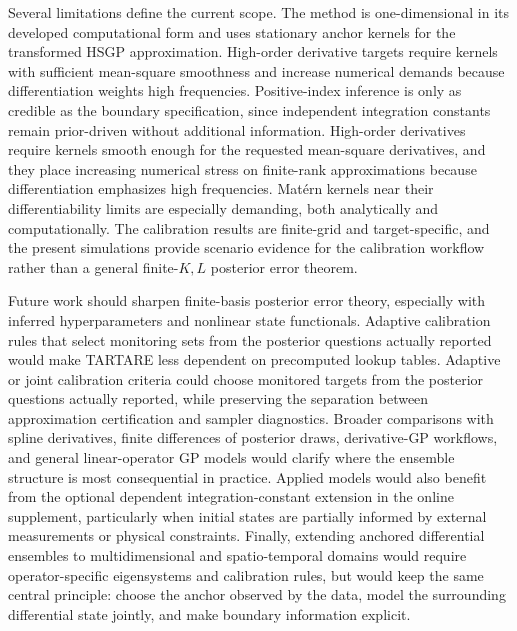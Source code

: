 \documentclass[11pt,a4paper]{article}
\theoremstyle{definition}
\theoremstyle{remark}
\begin{document}
Several limitations define the current scope. The method is one-dimensional in its developed computational form and uses stationary anchor kernels for the transformed HSGP approximation. High-order derivative targets require kernels with sufficient mean-square smoothness and increase numerical demands because differentiation weights high frequencies. Positive-index inference is only as credible as the boundary specification, since independent integration constants remain prior-driven without additional information.  High-order derivatives require kernels smooth enough for the requested mean-square derivatives, and they place increasing numerical stress on finite-rank approximations because differentiation emphasizes high frequencies.  Mat\'ern kernels near their differentiability limits are especially demanding, both analytically and computationally.  The calibration results are finite-grid and target-specific, and the present simulations provide scenario evidence for the calibration workflow rather than a general finite-\(K,L\) posterior error theorem.

Future work should sharpen finite-basis posterior error theory, especially with inferred hyperparameters and nonlinear state functionals. Adaptive calibration rules that select monitoring sets from the posterior questions actually reported would make TARTARE less dependent on precomputed lookup tables.  Adaptive or joint calibration criteria could choose monitored targets from the posterior questions actually reported, while preserving the separation between approximation certification and sampler diagnostics.  Broader comparisons with spline derivatives, finite differences of posterior draws, derivative-GP workflows, and general linear-operator GP models would clarify where the ensemble structure is most consequential in practice.  Applied models would also benefit from the optional dependent integration-constant extension in the online supplement, particularly when initial states are partially informed by external measurements or physical constraints.  Finally, extending anchored differential ensembles to multidimensional and spatio-temporal domains would require operator-specific eigensystems and calibration rules, but would keep the same central principle: choose the anchor observed by the data, model the surrounding differential state jointly, and make boundary information explicit.
\end{document}
